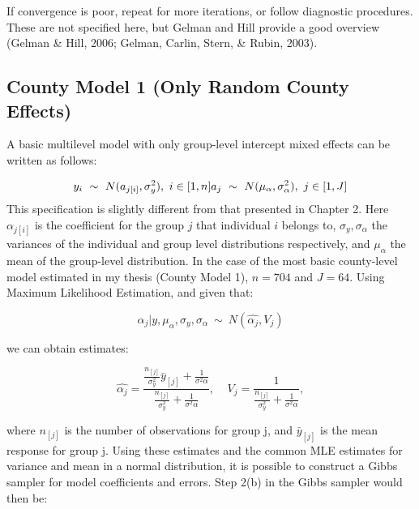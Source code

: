 \documentclass[12pt,twoside]{reedthesis}
\begin{document}
  If convergence is poor, repeat for more iterations, or follow diagnostic
  procedures. These are not specified here, but Gelman and Hill provide a
  good overview (Gelman \& Hill, 2006; Gelman, Carlin, Stern, \& Rubin,
  2003).
  
  \subsection{County Model 1 (Only Random County
  Effects)}\label{county-model-1-only-random-county-effects}
  
  A basic multilevel model with only group-level intercept mixed effects
  can be written as follows:
  
  \[y_i \ \sim \ N(a_{j[i]}, \sigma^2_y),\ i \in [1, n] \\ a_j \ \sim \ N(\mu_{\alpha}, \sigma^2_{\alpha}), \ j \in [1,J]\]
  This specification is slightly different from that presented in Chapter
  2. Here \(\alpha_{j[i]}\) is the coefficient for the group \(j\) that
  individual \(i\) belongs to, \(\sigma_y, \sigma_{\alpha}\) the variances
  of the individual and group level distributions respectively, and
  \(\mu_{\alpha}\) the mean of the group-level distribution. In the case
  of the most basic county-level model estimated in my thesis (County
  Model 1), \(n = 704\) and \(J = 64\). Using Maximum Likelihood
  Estimation, and given that:
  
  \begin{equation}
    \alpha_j|y, \mu_{\alpha}, \sigma_y, \sigma_{\alpha} \ \sim \ N(\hat{\alpha_j}, V_j)
  \end{equation}
  
  we can obtain estimates:
  
  \begin{equation}
  \hat{\alpha_j} = \frac{\frac{n_{[j]}}{\sigma^2_y}\bar{y}_{[j]} + \frac{1}{\sigma^2{\alpha}}}{\frac{n_{[j]}}{\sigma^2_y} + \frac{1}{\sigma^2{\alpha}}},\ \ \ \ \  V_j = \frac{1}{\frac{n_{[j]}}{\sigma^2_y} + \frac{1}{\sigma^2{\alpha}}},
  \end{equation}
  
  where \(n_{[j]}\) is the number of observations for group j, and
  \(\bar{y}_{[j]}\) is the mean response for group j. Using these
  estimates and the common MLE estimates for variance and mean in a normal
  distribution, it is possible to construct a Gibbs sampler for model
  coefficients and errors. Step 2(b) in the Gibbs sampler would then be:
  
\end{document}
